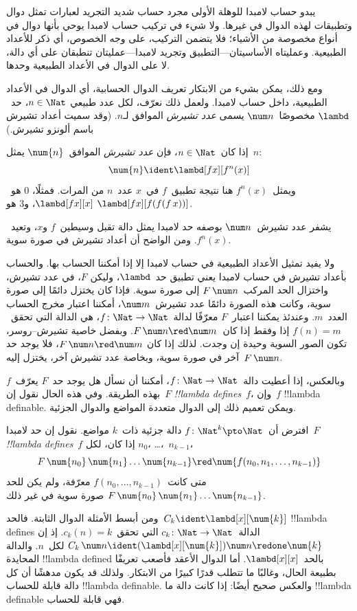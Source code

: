 \documentclass[../../../include/open-logic-section]{subfiles}
\begin{document}

يبدو حساب لامبدا للوهلة الأولى مجرد حساب شديد التجريد لعبارات تمثل
دوال وتطبيقات لهذه الدوال في غيرها. ولا شيء في تركيب حساب لامبدا يوحي
بأنها دوال في أنواع مخصوصة من الأشياء؛ فلا يتضمن التركيب، على وجه
الخصوص، أي ذكر للأعداد الطبيعية. وعمليتاه الأساسيتان---التطبيق وتجريد
لامبدا---عمليتان تنطبقان على أي دالة، لا على الدوال في الأعداد
الطبيعية وحدها.

ومع ذلك، يمكن بشيء من الابتكار تعريف الدوال الحسابية، أي الدوال في
الأعداد الطبيعية، داخل حساب لامبدا. ولعمل ذلك نعرّف، لكل عدد طبيعي
$n \in \Nat$، حد~$\lambd$ مخصوصًا~$\num n$ يسمى \emph{عدد تشيرش}
الموافق لـ$n$. (وقد سميت أعداد تشيرش باسم ألونزو تشيرش.)

\begin{defn}
  إذا كان~$n \in \Nat$، فإن \emph{عدد تشيرش} الموافق~$\num{n}$
  يمثل~$n$:
  \[
    \num{n} \ident \lambd[fx][f^n(x)]
  \]
  ويمثل~$f^n(x)$ هنا نتيجة تطبيق~$f$ في~$x$ عدد~$n$ من المرات.
  فمثلًا، $\num{0}$ هو~$\lambd[fx][x]$، و$\num{3}$ هو
  $\lambd[fx][f(f(f\,x))]$.
\end{defn}
  
يشفر عدد تشيرش~$\num n$ بوصفه حد لامبدا يمثل دالة تقبل وسيطين~$f$
و$x$، وتعيد~$f^n(x)$. ومن الواضح أن أعداد تشيرش في صورة سوية.

ولا يفيد تمثيل الأعداد الطبيعية في حساب لامبدا إلا إذا أمكننا الحساب
بها. والحساب بأعداد تشيرش في حساب لامبدا يعني تطبيق حد~$\lambd$، وليكن
$F$، في عدد تشيرش، واختزال الحد المركب~$F\, \num n$ إلى صورة سوية.
فإذا كان يختزل دائمًا إلى صورة سوية، وكانت هذه الصورة دائمًا عدد
تشيرش~$\num m$، أمكننا اعتبار مخرج الحساب العدد~$m$. وعندئذ يمكننا
اعتبار~$F$ معرّفًا لدالة~$f\colon \Nat \to \Nat$، هي الدالة التي
تحقق~$f(n) = m$ إذا وفقط إذا كان~$F\, \num n \red \num m$. وبفضل
خاصية تشيرش--روسر، تكون الصور السوية وحيدة إن وجدت. لذلك إذا كان
$F\, \num n \red \num m$، فلا يوجد حد آخر في صورة سوية، وبخاصة عدد
تشيرش آخر، يختزل إليه~$F \, \num n$.

وبالعكس، إذا أعطيت دالة~$f\colon \Nat \to \Nat$، أمكننا أن نسأل هل
يوجد حد~$F$ يعرّف~$f$ بهذه الطريقة. وفي هذه الحال نقول إن~$F$
\emph{!!{lambda define}s}~$f$، وإن~$f$ !!{lambda definable}. ويمكن
تعميم ذلك إلى الدوال متعددة المواضع والدوال الجزئية.

\begin{defn}
افترض أن~$f\colon \Nat^k \pto \Nat$ دالة جزئية ذات~$k$ مواضع. نقول
إن حد لامبدا~$F$ \emph{!!{lambda define}s}~$f$ إذا كان، لكل
  $n_0$، \dots،~$n_{k-1}$،
\[
F \, \num{n_0} \, \num{n_1} \dots \num{n_{k-1}} \red \num{f(n_0, n_1, \dots,
  n_{k-1})}
\]
متى كانت~$f(n_0, \dots, n_{k-1})$ معرّفة، ولم يكن للحد
$F \, \num{n_0} \, \num{n_1} \dots \num{n_{k-1}}$ صورة سوية في
غير ذلك.
\end{defn}

ومن أبسط الأمثلة الدوال الثابتة. فالحد~$C_k \ident
\lambd[x][\num{k}]$ !!{lambda define}s الدالة~$c_k\colon \Nat \to
\Nat$ التي تحقق~$c_k(n) = k$. إذ إن
$C_k \, \num n \ident (\lambd[x][\num{k}])\num n \redone \num{k}$
لكل~$n$. والدالة المحايدة !!{lambda defined} بالحد~$\lambd[x][x]$.
أما الدوال الأعقد فأصعب تعريفًا بطبيعة الحال، وغالبًا ما تتطلب قدرًا
كبيرًا من الابتكار. ولذلك قد يكون مدهشًا أن كل دالة قابلة للحساب
!!{lambda definable}. والعكس صحيح أيضًا: إذا كانت دالة ما
!!{lambda definable} فهي قابلة للحساب.
\end{document}
